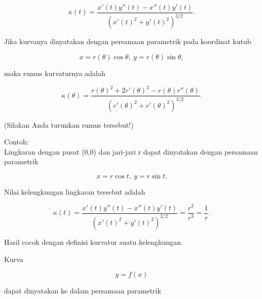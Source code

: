 \documentclass[a4paper,10pt]{article}
\begin{document}
\begin{eulernotebook}
\begin{eulercomment}
\begin{eulercomment}
\begin{eulercomment}
\begin{eulercomment}
\begin{eulercomment}
\end{eulercomment}
\begin{eulerformula}
\[
\kappa(t) = \frac{x'(t)y''(t)-x''(t)y'(t)}{\left(x'(t)^2+y'(t)^2\right)^{3/2}}.
\]
\end{eulerformula}
\begin{eulercomment}
Jika kurvanya dinyatakan dengan persamaan parametrik pada koordinat kutub

\end{eulercomment}
\begin{eulerformula}
\[
x=r(\theta)\cos\theta,\ y=r(\theta)\sin\theta,
\]
\end{eulerformula}
\begin{eulercomment}
maka rumus kurvaturnya adalah

\end{eulercomment}
\begin{eulerformula}
\[
\kappa(\theta) = \frac{r(\theta)^2+2r'(\theta)^2-r(\theta)r''(\theta)}{\left(r'(\theta)^2+r'(\theta)^2\right)^{3/2}}.
\]
\end{eulerformula}
\begin{eulercomment}
(Silakan Anda turunkan rumus tersebut!)

Contoh:\\
Lingkaran dengan pusat (0,0) dan jari-jari r dapat dinyatakan dengan persamaan parametrik

\end{eulercomment}
\begin{eulerformula}
\[
x=r\cos t,\ y=r\sin t.
\]
\end{eulerformula}
\begin{eulercomment}
Nilai kelengkungan lingkaran tersebut adalah

\end{eulercomment}
\begin{eulerformula}
\[
\kappa(t)=\frac{x'(t)y''(t)-x''(t)y'(t)}{\left(x'(t)^2+y'(t)^2\right)^{3/2}}=\frac{r^2}{r^3}=\frac 1 r.
\]
\end{eulerformula}
\begin{eulercomment}
Hasil cocok dengan definisi kurvatur suatu kelengkungan.
\end{eulercomment}
\begin{eulercomment}
Kurva

\end{eulercomment}
\begin{eulerformula}
\[
y=f(x)
\]
\end{eulerformula}
\begin{eulercomment}
dapat dinyatakan ke dalam persamaan parametrik


\end{eulercomment}
\end{eulercomment}
\end{eulercomment}
\end{eulercomment}
\end{eulercomment}
\end{eulernotebook}
\end{document}
